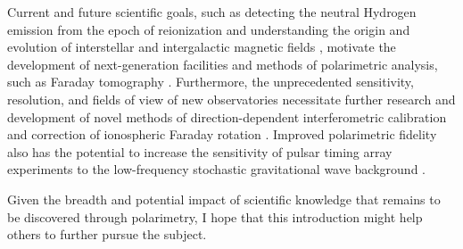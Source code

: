 Current and future scientific goals, such as detecting the neutral Hydrogen emission from the epoch of reionization \citep[e.g.,][]{2018ApJ...867...15T,2020MNRAS.493.1662M} and understanding the origin and evolution of interstellar and intergalactic magnetic fields \citep[e.g.,][]{2017ARA&A..55..111H}, motivate the development of next-generation facilities and methods of polarimetric analysis, such as Faraday tomography \citep[e.g.,][]{2000JGR...10516063G,2017A&A...597A..98V}.
%
Furthermore, the unprecedented sensitivity, resolution, and fields of view of new observatories necessitate further research and development of novel methods of direction-dependent interferometric calibration \citep[e.g.,][]{2015MNRAS.449.2668S} and correction of ionospheric Faraday rotation \citep[e.g.,][]{2019A&A...622A...5D}.
%
Improved polarimetric fidelity also has the potential to increase the sensitivity of pulsar timing array experiments to the low-frequency stochastic gravitational wave background \citep[e.g.,][]{gcv+23,rvg+24,gvc+25}.

Given the breadth and potential impact of scientific knowledge that remains to be discovered through polarimetry, I hope that this introduction might help others to further pursue the subject.
